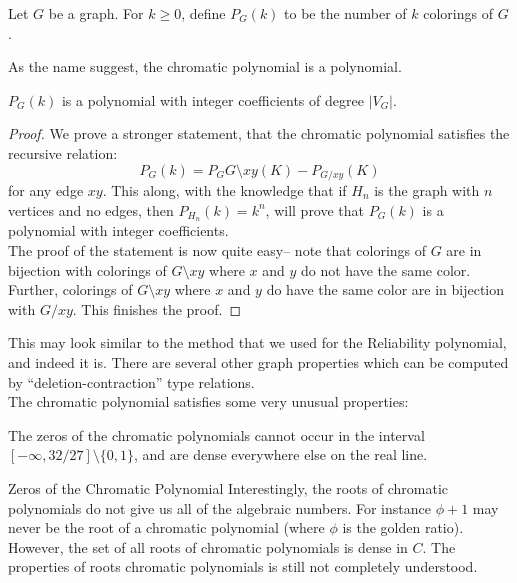 \begin{definition}
 Let $G$ be a graph. For $k\geq 0$, define $P_G(k)$ to be the number of $k$ colorings of $G$. 
\end{definition}
As the name suggest, the chromatic polynomial is a polynomial. 
\begin{theorem}
 $P_G(k)$ is a polynomial with integer coefficients of degree $|V_G|$. 
\end{theorem}
\begin{proof}
 We prove a stronger statement, that the chromatic polynomial satisfies the recursive relation:
 \[P_G(k)=P_G{G\setminus xy}(K)- P_{G/xy}(K)\]
 for any edge $xy$. This along, with the knowledge that if $H_n$ is the graph with $n$ vertices and no edges, then $P_{H_n}(k)=k^n$, will prove that $P_G(k)$ is a polynomial with integer coefficients. \\
 The proof of the statement is now quite easy-- note that colorings of $G$ are in bijection with colorings of $G\setminus xy$ where $x$ and $y$ do not have the same color. Further, colorings of $G\setminus xy$ where $x$ and $y$ do have the same color are in bijection with $G/xy$. This finishes the proof. 
\end{proof}
This may look similar to the method that we used for the Reliability polynomial, and indeed it is. There are several other graph properties which can be computed by ``deletion-contraction'' type relations. \\
The chromatic polynomial satisfies some very unusual properties:
\begin{theorem}
 The zeros of the chromatic polynomials cannot occur in the interval $[-\infty, 32/27]\setminus \{0, 1\}$, and are dense everywhere else on the real line.
\end{theorem}
\begin{projectdescription}{Zeros of the Chromatic Polynomial}
  Interestingly, the roots of chromatic polynomials do not give us all of the algebraic numbers. For instance $\phi+1$ may never be the root of a chromatic polynomial (where $\phi$ is the golden ratio). However, the set of all roots of chromatic polynomials is dense in $C$. The properties of roots chromatic polynomials is still not completely understood.
  \end{projectdescription}

